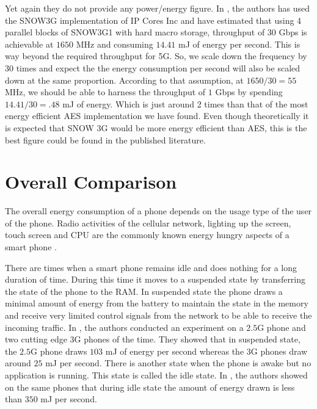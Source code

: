\documentclass[lnicst,sechang,a4paper]{svmultln}
\begin{document}
Yet again they do not provide any power/energy figure. In \cite{kolkata}, the authors has used the SNOW3G implementation of IP Cores Inc and have estimated that using 4 parallel blocks of SNOW3G1 with hard macro storage, throughput of 30 Gbps is achievable at $1650$ MHz and consuming $14.41$ mJ of energy per second. This is way beyond the required throughput for 5G. So, we scale down the frequency by $30$ times and expect the the energy consumption per second will also be scaled down at the same proportion. According to that assumption, at $1650/30=55$ MHz, we should be able to harness the throughput of $1$ Gbps by spending $14.41/30 = .48$ mJ of energy. Which is just around 2 times than that of the most energy efficient AES implementation we have found. Even though theoretically it is expected that SNOW 3G would be more energy efficient than AES, this is the best figure could be found in the published literature.

\section{Overall Comparison}
\label{sec:overall_comparison}
The overall energy consumption of a phone depends on the usage type of the user of the phone. Radio activities of the cellular network, lighting up the screen, touch screen and CPU are the commonly known energy hungry aspects of a smart phone \cite{Usenix_2010}. 

There are times when a smart phone remains idle and does nothing for a long duration of time. During this time it moves to a suspended state by transferring the state of the phone to the RAM. In suspended state the phone draws a minimal amount of energy from the battery to maintain the state in the memory and receive very limited control signals from the network to be able to receive the incoming traffic. In \cite{Usenix_2010}, the authors conducted an experiment on a $2.5$G phone and two cutting edge $3$G phones of the time. They showed that in suspended state, the $2.5$G phone draws $103$ mJ of energy per second whereas the 3G phones draw around $25$ mJ per second. There is another state when the phone is awake but no application is running. This state is called the idle state. In \cite{Usenix_2010}, the authors showed on the same phones that during idle state the amount of energy drawn is less than $350$ mJ per second. 
\end{document}
